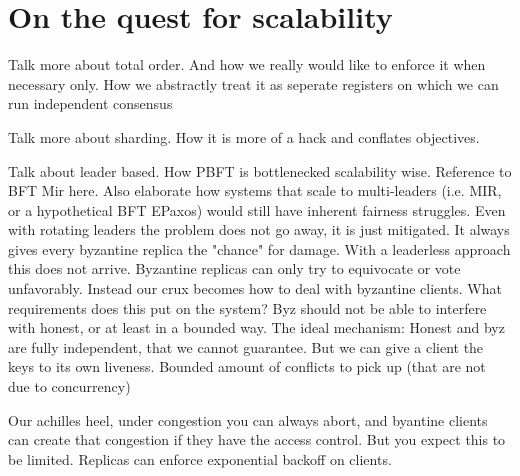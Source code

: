 \section{On the quest for scalability}

Talk more about total order. 
And how we really would like to enforce it when necessary only.
How we abstractly treat it as seperate registers on which we can run independent consensus

Talk more about sharding.
How it is more of a hack and conflates objectives.

Talk about leader based. How PBFT is bottlenecked scalability wise. Reference to BFT Mir here. 
Also elaborate how systems that scale to multi-leaders (i.e. MIR, or a hypothetical BFT EPaxos) would still have inherent fairness struggles. Even with rotating leaders the problem does not go away, it is just mitigated. It always gives every byzantine replica the "chance" for damage. With a leaderless approach this does not arrive. Byzantine replicas can only try to equivocate or vote unfavorably.
Instead our crux becomes how to deal with byzantine clients.
What requirements does this put on the system? Byz should not be able to interfere with honest, or at least in a bounded way.
The ideal mechanism: Honest and byz are fully independent, that we cannot guarantee. But we can give a client the keys to its own liveness. Bounded amount of conflicts to pick up (that are not due to concurrency)

Our achilles heel, under congestion you can always abort, and byantine clients can create that congestion if they have the access control. But you expect this to be limited. 
Replicas can enforce exponential backoff on clients.